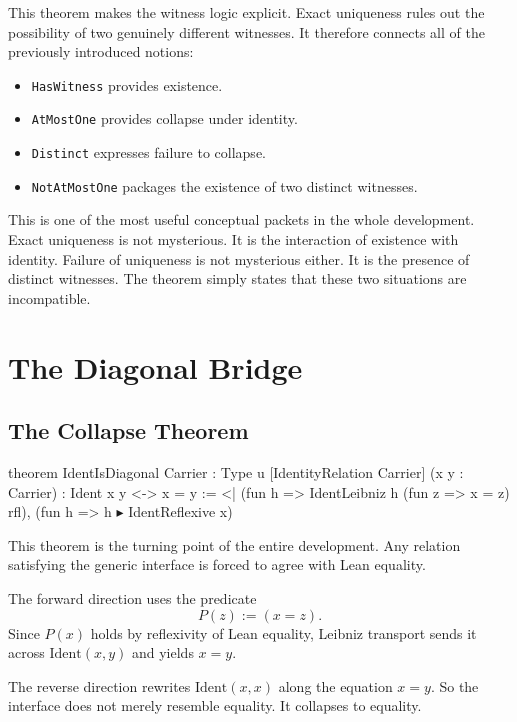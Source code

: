 \documentclass[11pt]{article}
\newcommand{\leaninline}[1]{\texttt{#1}}
\begin{document}
This theorem makes the witness logic explicit. Exact uniqueness rules out the possibility of two genuinely different witnesses. It therefore connects all of the previously introduced notions:

\begin{itemize}[leftmargin=1.5em]
\item \leaninline{HasWitness} provides existence.
\item \leaninline{AtMostOne} provides collapse under identity.
\item \leaninline{Distinct} expresses failure to collapse.
\item \leaninline{NotAtMostOne} packages the existence of two distinct witnesses.
\end{itemize}

This is one of the most useful conceptual packets in the whole development. Exact uniqueness is not mysterious. It is the interaction of existence with identity. Failure of uniqueness is not mysterious either. It is the presence of distinct witnesses. The theorem simply states that these two situations are incompatible.

\section{The Diagonal Bridge}

\subsection{The Collapse Theorem}

\begin{leanblock}
theorem IdentIsDiagonal {Carrier : Type u} [IdentityRelation Carrier]
    (x y : Carrier) : Ident x y <-> x = y :=
  <| (fun h => IdentLeibniz h (fun z => x = z) rfl),
     (fun h => h ▸ IdentReflexive x)
\end{leanblock}

This theorem is the turning point of the entire development. Any relation satisfying the generic interface is forced to agree with Lean equality.

The forward direction uses the predicate
\[
P(z) := (x = z).
\]
Since \(P(x)\) holds by reflexivity of Lean equality, Leibniz transport sends it across \(\mathrm{Ident}(x,y)\) and yields \(x = y\).

The reverse direction rewrites \(\mathrm{Ident}(x,x)\) along the equation \(x = y\). So the interface does not merely resemble equality. It collapses to equality.
\end{document}
